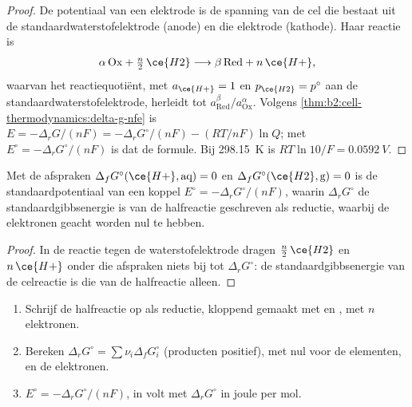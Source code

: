\begin{proof}
De potentiaal van een elektrode is de spanning van de cel die bestaat uit de
standaardwaterstofelektrode (anode) en die elektrode (kathode). Haar reactie is
\[
  \alpha\,\mathrm{Ox} + \tfrac n2\,\ce{H2} \longrightarrow \beta\,\mathrm{Red} + n\,\ce{H+} ,
\]
waarvan het reactiequotiënt, met $a_{\ce{H+}} = 1$ en $p_{\ce{H2}} = p^\circ$ aan
de standaardwaterstofelektrode, herleidt tot $a_{\mathrm{Red}}^\beta/
a_{\mathrm{Ox}}^\alpha$. Volgens \cref{thm:b2:cell-thermodynamics:delta-g-nfe} is
$E = -\Delta_r G/(nF) = -\Delta_r G^\circ/(nF) - (RT/nF)\ln Q$; met $E^\circ =
-\Delta_r G^\circ/(nF)$ is dat de formule. Bij \qty{298.15}{K} is $RT\ln 10/F =
\qty{0.0592}{V}$.
\end{proof}

\begin{proposition}\label{prop:b2:cell-thermodynamics:standard-potential}
Met de afspraken $\Delta_f G^\circ(\ce{H+}, \text{aq}) = 0$ en
$\Delta_f G^\circ(\ce{H2}, \text{g}) = 0$ is de standaardpotentiaal van een koppel
$E^\circ = -\Delta_r G^\circ/(nF)$, waarin $\Delta_r G^\circ$ de standaardgibbsenergie
is van de halfreactie geschreven als reductie, waarbij de elektronen geacht worden
 nul te hebben.
\end{proposition}

\begin{proof}
In de reactie tegen de waterstofelektrode dragen $\tfrac n2\,\ce{H2}$ en
$n\,\ce{H+}$ onder die afspraken niets bij tot $\Delta_r G^\circ$: de
standaardgibbsenergie van de celreactie is die van de halfreactie alleen.
\end{proof}

\begin{method}\label{met:b2:cell-thermodynamics:e-from-gibbs}
\begin{enumerate}
  \item Schrijf de halfreactie op als reductie, kloppend gemaakt met  en
        , met $n$ elektronen.
  \item Bereken $\Delta_r G^\circ = \sum\nu_i\Delta_f G^\circ_i$ (producten
        positief), met nul voor de elementen,  en de elektronen.
  \item $E^\circ = -\Delta_r G^\circ/(nF)$, in volt met $\Delta_r G^\circ$ in
        joule per mol.
\end{enumerate}
\end{method}

